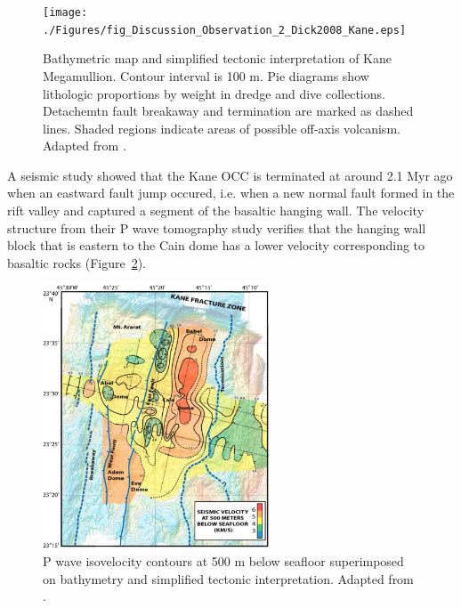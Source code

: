 \begin{figure}[h]
 \centering
  \texttt{[image: ./Figures/fig\_Discussion\_Observation\_2\_Dick2008\_Kane.eps]}
 \caption[Bathymetric map and simplified tectonic interpretation of Kane Megamullion. Adapted from \citep{Dick2008}.]{Bathymetric map and simplified tectonic interpretation of Kane Megamullion. Contour interval is 100 m. Pie diagrams show lithologic proportions by weight in dredge and dive collections. Detachemtn fault breakaway and termination are marked as dashed lines. Shaded regions indicate areas of possible off-axis volcanism. Adapted from \citep{Dick2008}.}
 \label{fig_Discussion_Observation_2_Dick2008_Kane}
\end{figure}

A seismic study \citep{Xu2009} showed that the Kane OCC is terminated at around 2.1 Myr ago when an eastward fault jump occured, i.e. when a new normal fault formed in the rift valley and captured a segment of the basaltic hanging wall. The velocity structure from their P wave tomography study verifies that the hanging wall block that is eastern to the Cain dome has a lower velocity corresponding to basaltic rocks (Figure~\hyperref[fig_Discussion_Observation_1_Xu2009_SeismicV_Kane]{\ref{fig_Discussion_Observation_1_Xu2009_SeismicV_Kane}}).

\begin{figure}[h]
 \centering
  \includegraphics[width=0.6\textwidth]{./Figures/fig_Discussion_Observation_1_Xu2009_SeismicV_Kane.eps}
 \caption{P wave isovelocity contours at 500 m below seafloor superimposed on bathymetry and simplified tectonic interpretation. Adapted from \citep{Xu2009}.}
 \label{fig_Discussion_Observation_1_Xu2009_SeismicV_Kane}
\end{figure}

